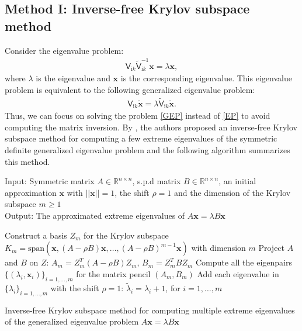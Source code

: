\subsection{Method I: Inverse-free Krylov subspace method}
Consider the eigenvalue problem: 
\begin{align} \label{EP}
    \mathsf{V}_{\mathrm{i}k}\tilde{\mathsf{V}}_{\mathrm{i}k}^{-1}\boldsymbol{x} = \lambda\boldsymbol{x},
\end{align}
where $\lambda$ is the eigenvalue and $\boldsymbol{x}$ is the corresponding eigenvalue. This eigenvalue problem is equivalent to the following generalized eigenvalue problem:
\begin{align}\label{GEP}
    \mathsf{V}_{\mathrm{i}k}\tilde{\boldsymbol{x}} = \lambda \tilde{\mathsf{V}}_{\mathrm{i}k}\tilde{\boldsymbol{x}}.
\end{align}
Thus, we can focus on solving the problem \eqref{GEP} instead of \eqref{EP} to avoid computing the matrix inversion. By \cite{golub2002inverse}\cite{money2005algorithm},
the authors proposed an inverse-free Krylov subspace method for computing a few extreme eigenvalues of the symmetric definite generalized eigenvalue problem 
and the following algorithm summarizes this method.

\begin{algorithm}[H]
    \SetAlgoLined
    Input: Symmetric matrix $A\in\mathbb{R}^{n\times n}$, s.p.d matrix $B\in\mathbb{R}^{n\times n}$, an initial approximation $\boldsymbol{x}$ with $||\boldsymbol{x}|| = 1$,
    the shift $\rho = 1$ and the dimension of the Krylov subspace $m\geq 1$\\
    Output: The approximated extreme eigenvalues of $A\boldsymbol{x} = \lambda B\boldsymbol{x}$\\
    \begin{algorithmic}[1]
        
        \STATE Construct a basis $Z_{m}$ for the Krylov subspace $K_{m} = \text{span}(\boldsymbol{x}, (A - \rho B)\boldsymbol{x}, \dots, (A - \rho B)^{m-1}\boldsymbol{x})$ with dimension $m$
        \STATE Project $A$ and $B$ on $Z$: $A_{m} = Z_{m}^{T}(A - \rho B)Z_{m}$, $B_{m} = Z_{m}^{T}BZ_{m}$
        \STATE Compute all the eigenpairs $\{(\lambda_{i}, \boldsymbol{x}_{i})\}_{i = 1, \dots, m}$ for the matrix pencil $(A_{m}, B_{m})$
        \STATE Add each eigenvalue in $\{\lambda_{i}\}_{i = 1, \dots, m}$ with the shift $\rho = 1$: $\tilde{\lambda}_{i} = \lambda_{i} + 1$, for $i = 1, \dots, m$
        \end{algorithmic}
    \caption{Inverse-free Krylov subspace method for computing multiple extreme eigenvalues of the generalized eigenvalue problem $A\boldsymbol{x} = \lambda B\boldsymbol{x}$}
    \label{Alg for computing the evals kry}
    \end{algorithm}
    
